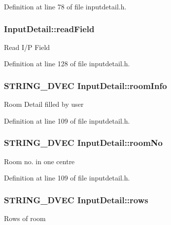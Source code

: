 \-Definition at line 78 of file inputdetail.\-h.

\hypertarget{classInputDetail_ac0cc70b017ef94fb55acb46fc44f0df5}{
\subsubsection[{read\-Field}]{ {\bf \-Input\-Detail\-::read\-Field}}}\label{classInputDetail_ac0cc70b017ef94fb55acb46fc44f0df5}
\-Read \-I/\-P \-Field 

\-Definition at line 128 of file inputdetail.\-h.

\hypertarget{classInputDetail_a7472fa615f318a2553b750529c3a4b0e}{
\subsubsection[{room\-Info}]{\setlength{\rightskip}{0pt plus 5cm}\-S\-T\-R\-I\-N\-G\-\_\-D\-V\-E\-C {\bf \-Input\-Detail\-::room\-Info}}}\label{classInputDetail_a7472fa615f318a2553b750529c3a4b0e}
\-Room \-Detail filled by user 

\-Definition at line 109 of file inputdetail.\-h.

\hypertarget{classInputDetail_a3193354764ba0b44b2eb4b366b4c273a}{
\subsubsection[{room\-No}]{\setlength{\rightskip}{0pt plus 5cm}\-S\-T\-R\-I\-N\-G\-\_\-D\-V\-E\-C {\bf \-Input\-Detail\-::room\-No}}}\label{classInputDetail_a3193354764ba0b44b2eb4b366b4c273a}
\-Room no. in one centre 

\-Definition at line 109 of file inputdetail.\-h.

\hypertarget{classInputDetail_aa203edbcfd4083624dbc4dc055c1e6e5}{
\subsubsection[{rows}]{\setlength{\rightskip}{0pt plus 5cm}\-S\-T\-R\-I\-N\-G\-\_\-D\-V\-E\-C {\bf \-Input\-Detail\-::rows}}}\label{classInputDetail_aa203edbcfd4083624dbc4dc055c1e6e5}
\-Rows of room 

